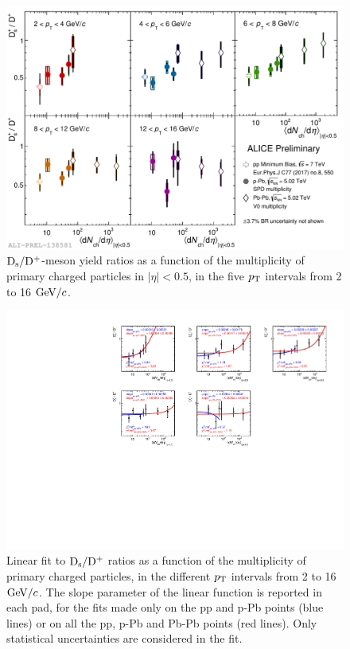 \begin{figure}[h!]
    \begin{center}
          \includegraphics[width=1\textwidth]{./FigCap6/DsOverDplusVsMult_pp_pPb_PbPb.pdf}
    \end{center}
    \caption{ ${\rm D_s}/{\rm D^+}$-meson yield ratios as a function of the multiplicity of primary charged particles in $|\eta|<0.5$, in the five $p_{\rm T}$ intervals from 2 to 16 $\mathrm{GeV}/c$.}
    \label{fig:DsDplusRatios}
\end{figure}

\begin{figure}[h!]
    \begin{center}
          \includegraphics[width=1.1\textwidth]{./FigCap6/Fit_DsOverDplusVsMult_pp7TeV_pPb5TeV_PbPb5TeV.pdf}
    \end{center}
    \caption{Linear fit to ${\rm D_s}/{\rm D^+}$ ratios as a function of the multiplicity of primary charged particles, in the different $p_{\rm T}$ intervals from 2 to 16 $\mathrm{GeV}/c$. The slope parameter of the linear function is reported in each pad, for the fits made only on the pp and p-Pb points (blue lines) or on
    all the pp, p-Pb and Pb-Pb points (red lines). Only statistical uncertainties are considered in the fit.}
    \label{fig:FitRatios}
\end{figure}





